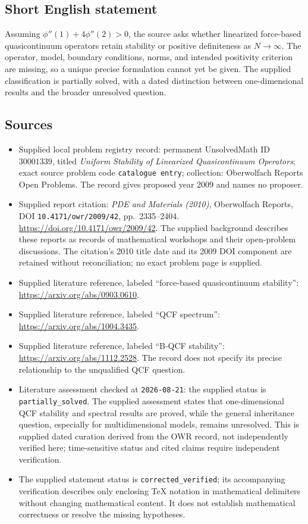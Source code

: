 \documentclass[11pt]{article}
\begin{document}
\subsection{Short English statement}
Assuming \(\phi''(1)+4\phi''(2)>0\), the source asks whether linearized force-based quasicontinuum operators retain stability or positive definiteness as \(N\to\infty\). The operator, model, boundary conditions, norms, and intended positivity criterion are missing, so a unique precise formulation cannot yet be given. The supplied classification is partially solved, with a dated distinction between one-dimensional results and the broader unresolved question.
\subsection{Sources}
\begin{itemize}
\item Supplied local problem registry record: permanent UnsolvedMath ID \(30001339\), titled \emph{Uniform Stability of Linearized Quasicontinuum Operators}; exact source problem code \texttt{catalogue entry}; collection: Oberwolfach Reports Open Problems. The record gives proposed year 2009 and names no proposer.
\item Supplied report citation: \emph{PDE and Materials (2010)}, Oberwolfach Reports, DOI \texttt{10.4171/owr/2009/42}, pp.~2335--2404. \url{https://doi.org/10.4171/owr/2009/42}. The supplied background describes these reports as records of mathematical workshops and their open-problem discussions. The citation's 2010 title date and its 2009 DOI component are retained without reconciliation; no exact problem page is supplied.
\item Supplied literature reference, labeled ``force-based quasicontinuum stability'': \url{https://arxiv.org/abs/0903.0610}.
\item Supplied literature reference, labeled ``QCF spectrum'': \url{https://arxiv.org/abs/1004.3435}.
\item Supplied literature reference, labeled ``B-QCF stability'': \url{https://arxiv.org/abs/1112.2528}. The record does not specify its precise relationship to the unqualified QCF question.
\item Literature assessment checked at \texttt{2026-08-21}: the supplied status is \texttt{partially\_solved}. The supplied assessment states that one-dimensional QCF stability and spectral results are proved, while the general inheritance question, especially for multidimensional models, remains unresolved. This is supplied dated curation derived from the OWR record, not independently verified here; time-sensitive status and cited claims require independent verification.
\item The supplied statement status is \texttt{corrected\_verified}; its accompanying verification describes only enclosing TeX notation in mathematical delimiters without changing mathematical content. It does not establish mathematical correctness or resolve the missing hypotheses.
\end{itemize}
\end{document}
